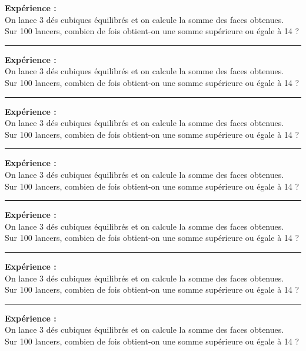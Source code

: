 \documentclass[20pt]{article}
\begin{document}
\textbf{Expérience :} \\
On lance 3 dés cubiques équilibrés et on calcule la somme des faces obtenues. \\
Sur 100 lancers, combien  de fois obtient-on une somme supérieure ou égale  à 14 ?
\vspace{0.2cm}
\hrule
\vspace{1cm}

\textbf{Expérience :} \\
On lance 3 dés cubiques équilibrés et on calcule la somme des faces obtenues. \\
Sur 100 lancers, combien  de fois obtient-on une somme supérieure ou égale  à 14 ?
\vspace{0.2cm}
\hrule
\vspace{1cm}
\textbf{Expérience :} \\
On lance 3 dés cubiques équilibrés et on calcule la somme des faces obtenues. \\
Sur 100 lancers, combien  de fois obtient-on une somme supérieure ou égale  à 14 ?
\vspace{0.2cm}
\hrule
\vspace{1cm}
\textbf{Expérience :} \\
On lance 3 dés cubiques équilibrés et on calcule la somme des faces obtenues. \\
Sur 100 lancers, combien  de fois obtient-on une somme supérieure ou égale  à 14 ?
\vspace{0.2cm}
\hrule
\vspace{1cm}
\textbf{Expérience :} \\
On lance 3 dés cubiques équilibrés et on calcule la somme des faces obtenues. \\
Sur 100 lancers, combien  de fois obtient-on une somme supérieure ou égale  à 14 ?
\vspace{0.2cm}
\hrule
\vspace{1cm}
\textbf{Expérience :} \\
On lance 3 dés cubiques équilibrés et on calcule la somme des faces obtenues. \\
Sur 100 lancers, combien  de fois obtient-on une somme supérieure ou égale  à 14 ?
\vspace{0.2cm}
\hrule
\vspace{1cm}
\textbf{Expérience :} \\
On lance 3 dés cubiques équilibrés et on calcule la somme des faces obtenues. \\
Sur 100 lancers, combien  de fois obtient-on une somme supérieure ou égale  à 14 ?
\end{document}

